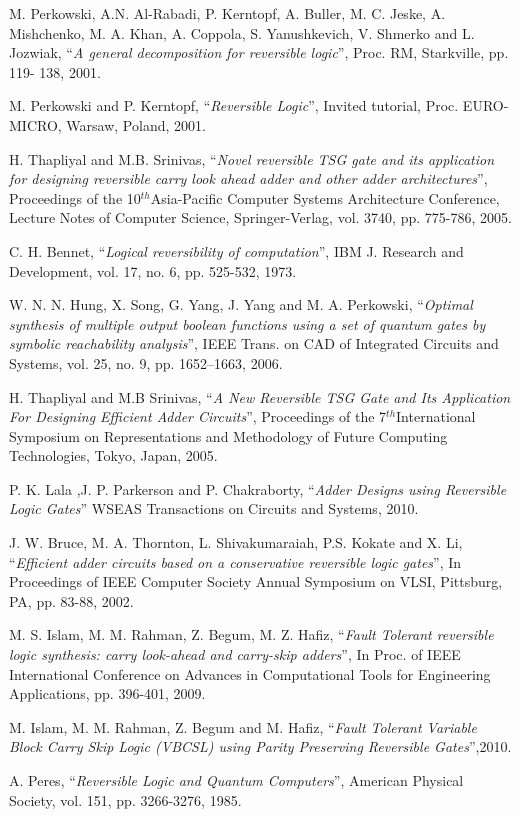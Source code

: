 \noindent [6] M. Perkowski,  A.N. Al-Rabadi, P. Kerntopf, A. Buller, M. C. Jeske, A. Mishchenko, M. A. Khan, A. Coppola, S. Yanushkevich, V. Shmerko and L. Jozwiak, ``{\it A general decomposition for reversible logic}'', Proc. RM, Starkville, pp. 119- 138, 2001.

\noindent [7] M. Perkowski and P. Kerntopf, ``{\it Reversible Logic}'', Invited tutorial, Proc. EURO-MICRO, Warsaw, Poland, 2001.

\noindent [8] H. Thapliyal and M.B. Srinivas, ``{\it Novel reversible TSG gate and its application for designing reversible carry look ahead adder and other adder architectures}'', Proceedings of the 10${}^{th}$Asia-Pacific Computer Systems Architecture Conference, Lecture Notes of Computer Science, Springer-Verlag, vol. 3740, pp. 775-786, 2005.

\noindent [9] C. H. Bennet, ``{\it Logical reversibility of computation}'', IBM J. Research and Development, vol. 17, no. 6, pp. 525-532, 1973.

\noindent [10] W. N. N. Hung, X. Song, G. Yang, J. Yang and M. A. Perkowski, ``{\it Optimal synthesis of multiple output boolean functions using a set of quantum gates by symbolic reachability analysis}'', IEEE Trans. on CAD of Integrated Circuits and Systems, vol. 25, no. 9, pp. 1652--1663, 2006.

\noindent [11] H. Thapliyal and M.B Srinivas, ``{\it A New Reversible TSG Gate and Its Application For Designing Efficient Adder Circuits}'', Proceedings of the 7${}^{th}$International Symposium on Representations and Methodology of Future Computing Technologies, Tokyo, Japan, 2005. 

\noindent [12] P. K. Lala ,J. P. Parkerson and P. Chakraborty, ``{\it Adder Designs using Reversible Logic Gates}''  WSEAS Transactions on Circuits and Systems, 2010.

\noindent [13] J. W. Bruce, M. A. Thornton, L. Shivakumaraiah, P.S. Kokate and X. Li, ``{\it Efficient adder circuits based on a conservative reversible logic gates}'', In Proceedings of IEEE Computer Society Annual Symposium on VLSI, Pittsburg, PA, pp. 83-88, 2002.

\noindent [14] M. S. Islam, M. M. Rahman, Z. Begum, M. Z. Hafiz, ``{\it Fault Tolerant reversible logic synthesis: carry look-ahead and carry-skip adders}'', In Proc. of IEEE International Conference on Advances in Computational Tools for Engineering Applications, pp. 396-401, 2009.

\noindent [15] M. Islam, M. M. Rahman, Z. Begum and M. Hafiz, ``{\it Fault Tolerant Variable Block Carry Skip Logic (VBCSL) using Parity Preserving Reversible Gates}'',2010. 

\noindent [17] A. Peres, ``{\it Reversible Logic and Quantum Computers}'', American Physical Society, vol. 151, pp. 3266-3276, 1985.